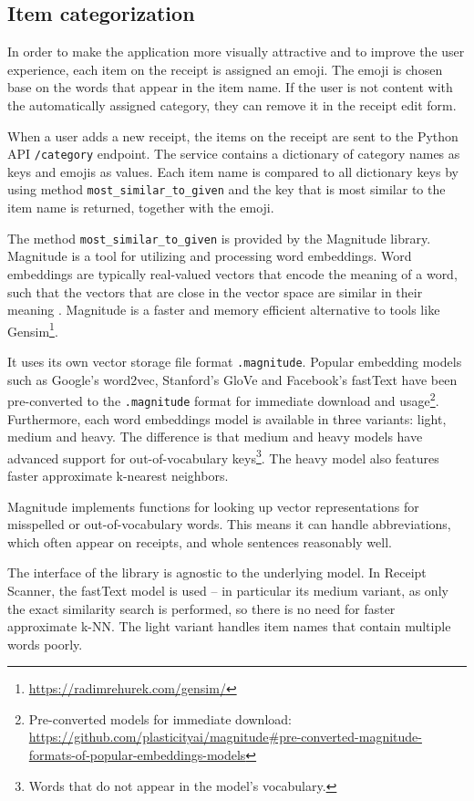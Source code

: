 \documentclass[
  digital, %
  table,   %
  oneside, %
  lof,     %
  lot,     %
]{fithesis3}
\begin{document}
\subsection{Item categorization}
In order to make the application more visually attractive and to improve the user experience, each item on the receipt is assigned an emoji. The emoji is chosen base on the words that appear in the item name. If the user is not content with the automatically assigned category, they can remove it in the receipt edit form.

When a user adds a new receipt, the items on the receipt are sent to the Python API \texttt{/category} endpoint. The service contains a dictionary of category names as keys and emojis as values. Each item name is compared to all dictionary keys by using method \texttt{most\_similar\_to\_given} and the key that is most similar to the item name is returned, together with the emoji.

The method \texttt{most\_similar\_to\_given} is provided by the Magnitude library\cite{PatelEtal2018Magnitude}. Magnitude is a tool for utilizing and processing word embeddings. Word embeddings are typically real-valued vectors that encode the meaning of a word, such that the vectors that are close in the vector space are similar in their meaning \cite{Jurafsky2020Speech}. Magnitude is a faster and memory efficient alternative to tools like Gensim\footnote{\url{https://radimrehurek.com/gensim/}}. 

It uses its own vector storage file format \texttt{.magnitude}.
Popular embedding models such as Google's word2vec, Stanford's GloVe and Facebook's fastText have been pre-converted to the \texttt{.magnitude} format for immediate download and usage\footnote{Pre-converted models for immediate download: \url{https://github.com/plasticityai/magnitude\#pre-converted-magnitude-formats-of-popular-embeddings-models}}. Furthermore, each word embeddings model is available in three variants: light, medium and heavy. The difference is that medium and heavy models have advanced support for out-of-vocabulary keys\footnote{Words that do not appear in the model's vocabulary.}. The heavy model also features faster approximate k-nearest neighbors.

Magnitude implements functions for looking up
vector representations for misspelled or out-of-vocabulary words. This means it can handle abbreviations, which often appear on receipts, and whole sentences reasonably well.

The interface of the library is agnostic to the underlying model.
In Receipt Scanner, the fastText model is used – in particular its medium variant, as only the exact similarity search is performed, so there is no need for faster approximate k-NN. The light variant handles item names that contain multiple words poorly.
\end{document}
